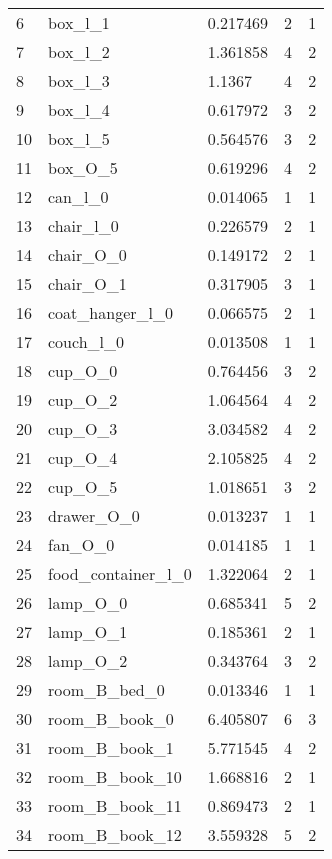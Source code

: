 \begin{longtable}{@{\zz\extracolsep{\fill}} l|llll}
6  & box\_l\_1                & 0.217469 & 2 & 1 \\
7  & box\_l\_2                & 1.361858 & 4 & 2 \\
8  & box\_l\_3                & 1.1367   & 4 & 2 \\
9  & box\_l\_4                & 0.617972 & 3 & 2 \\
10 & box\_l\_5                & 0.564576 & 3 & 2 \\
11 & box\_O\_5                & 0.619296 & 4 & 2 \\
12 & can\_l\_0                & 0.014065 & 1 & 1 \\
13 & chair\_l\_0              & 0.226579 & 2 & 1 \\
14 & chair\_O\_0              & 0.149172 & 2 & 1 \\
15 & chair\_O\_1              & 0.317905 & 3 & 1 \\
16 & coat\_hanger\_l\_0       & 0.066575 & 2 & 1 \\
17 & couch\_l\_0              & 0.013508 & 1 & 1 \\
18 & cup\_O\_0                & 0.764456 & 3 & 2 \\
19 & cup\_O\_2                & 1.064564 & 4 & 2 \\
20 & cup\_O\_3                & 3.034582 & 4 & 2 \\
21 & cup\_O\_4                & 2.105825 & 4 & 2 \\
22 & cup\_O\_5                & 1.018651 & 3 & 2 \\
23 & drawer\_O\_0             & 0.013237 & 1 & 1 \\
24 & fan\_O\_0                & 0.014185 & 1 & 1 \\
25 & food\_container\_l\_0    & 1.322064 & 2 & 1 \\
26 & lamp\_O\_0               & 0.685341 & 5 & 2 \\
27 & lamp\_O\_1               & 0.185361 & 2 & 1 \\
28 & lamp\_O\_2               & 0.343764 & 3 & 2 \\
29 & room\_B\_bed\_0          & 0.013346 & 1 & 1 \\
30 & room\_B\_book\_0         & 6.405807 & 6 & 3 \\
31 & room\_B\_book\_1         & 5.771545 & 4 & 2 \\
32 & room\_B\_book\_10        & 1.668816 & 2 & 1 \\
33 & room\_B\_book\_11        & 0.869473 & 2 & 1 \\
34 & room\_B\_book\_12        & 3.559328 & 5 & 2 \\

\end{longtable}

